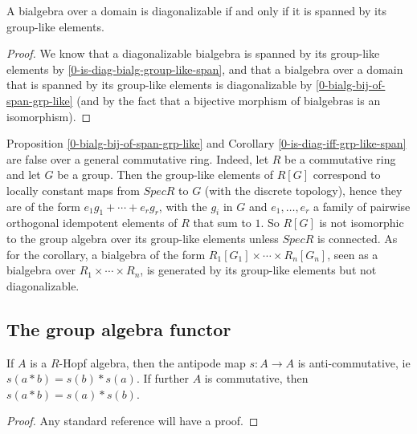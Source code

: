 \begin{corollary}
  \label{0-is-diag-bialg-iff-span-group-like}
  \leanok

  A bialgebra over a domain is diagonalizable if and only if it is spanned by its
  group-like elements.
\end{corollary}
\begin{proof}
  \leanok

  We know that a diagonalizable bialgebra is spanned by its group-like elements
  by \ref{0-is-diag-bialg-group-like-span}, and that a bialgebra over a domain
  that is spanned by its group-like elements is diagonalizable by
  \ref{0-bialg-bij-of-span-grp-like} (and by the fact that a bijective morphism
  of bialgebras is an isomorphism).
\end{proof}

Proposition \ref{0-bialg-bij-of-span-grp-like} and Corollary \ref{0-is-diag-iff-grp-like-span} are false over a general commutative ring.
Indeed, let $R$ be a commutative ring and let $G$ be a group.
Then the group-like elements of $R[G]$ correspond to locally constant maps from $Spec R$ to $G$ (with the discrete topology),
hence they are of the form $e_1 g_1+\cdots+e_r g_r$, with the $g_i$ in $G$ and $e_1,\ldots,e_r$ a family of pairwise orthogonal idempotent elements of $R$ that sum to $1$.
So $R[G]$ is not isomorphic to the group algebra over its group-like elements unless $Spec R$ is connected.
As for the corollary, a bialgebra of the form $R_1[G_1]\times\cdots\times R_n[G_n]$,
seen as a bialgebra over $R_1\times\cdots\times R_n$,
is generated by its group-like elements but not diagonalizable.


\subsection{The group algebra functor}


\begin{proposition}
  \label{0-antipode-mul}
  \uses{}
  \leanok

  If $A$ is a $R$-Hopf algebra, then the antipode map $s : A \to A$ is anti-commutative, ie $s(a * b) = s(b) * s(a)$. If further $A$ is commutative, then $s(a * b) = s(a) * s(b)$.
\end{proposition}
\begin{proof}
  \uses{}
  \leanok

  Any standard reference will have a proof.
\end{proof}


